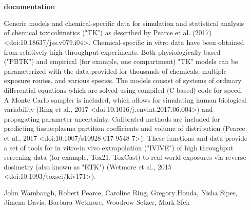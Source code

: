 \documentclass[a4paper]{book}
\begin{document}
\chapter*{}
\begin{center}
{\textbf{\huge \R{} documentation}} \par{}
\par\bigskip{\large \today}
\end{center}
%
\begin{Description}\relax
Generic models and chemical-specific data for simulation and
             statistical analysis of chemical toxicokinetics ("TK") as
             described by Pearce et al. (2017) <doi:10.18637/jss.v079.i04>.
             Chemical-specific in vitro data have been obtained from relatively
             high throughput experiments. Both physiologically-based ("PBTK")
             and empirical (for example, one compartment) "TK" models can be
             parameterized with the data provided for thousands of chemicals,
             multiple exposure routes, and various species. The models consist
             of systems of ordinary differential equations which are solved
             using compiled (C-based) code for speed. A Monte Carlo sampler is
             included, which allows for simulating human biological variability
             (Ring et al., 2017 <doi:10.1016/j.envint.2017.06.004>)
             and propagating parameter uncertainty. Calibrated methods are
             included for predicting tissue:plasma partition coefficients and
             volume of distribution
             (Pearce et al., 2017 <doi:10.1007/s10928-017-9548-7>).
             These functions and data provide a set of tools for
             in vitro-in vivo extrapolation ("IVIVE") of high throughput
             screening data (for example, Tox21, ToxCast) to real-world
             exposures via reverse dosimetry (also known as "RTK")
             (Wetmore et al., 2015 <doi:10.1093/toxsci/kfv171>).
\end{Description}
%
\begin{Author}\relax
John Wambaugh, Robert Pearce, Caroline Ring, Gregory Honda, Nisha
Sipes, Jimena Davis, Barbara Wetmore, Woodrow Setzer, Mark Sfeir
\end{Author}
%
\end{document}

